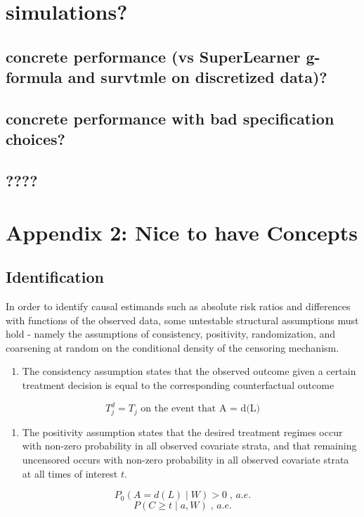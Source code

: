 \documentclass{report}
\newcommand{\1}{\ensuremath{\mathbf{1}}}
\renewcommand{\L}{\ensuremath{W}}
\begin{document}
\section{simulations?}
\label{sec:org6e34e94}
\subsection{concrete performance (vs SuperLearner g-formula and survtmle on discretized data)?}
\label{sec:org7b5f103}
\subsection{concrete performance with bad specification choices?}
\label{sec:org848e452}
\subsection{????}
\label{sec:orgdc46735}

\section{Appendix 2: Nice to have Concepts}
\label{sec:orgcf57579}

\subsection{Identification}
\label{identification}
In order to identify causal estimands such as absolute risk ratios and differences with functions of the observed data, some untestable structural assumptions must hold - namely the assumptions of consistency, positivity, randomization, and coarsening at random on the conditional density of the censoring mechanism. 


\begin{enumerate}
\item The consistency assumption states that the observed outcome given a certain treatment decision is equal to the corresponding counterfactual outcome
\end{enumerate}
\[ T^d_j = T_j \text{ on the event that A = d(L)} \]

\begin{enumerate}
\item The positivity assumption states that the desired treatment regimes occur with non-zero probability in all observed covariate strata, and that remaining uncensored occurs with non-zero probability in all observed covariate strata at all times of interest \(t\).
\end{enumerate}
\[ P_0\left( A = d(L) \mid \L \right) > 0 \;,\, a.e. \]
\[ P(C \geq t \mid a, \L) \;,\, a.e. \]
\end{document}
